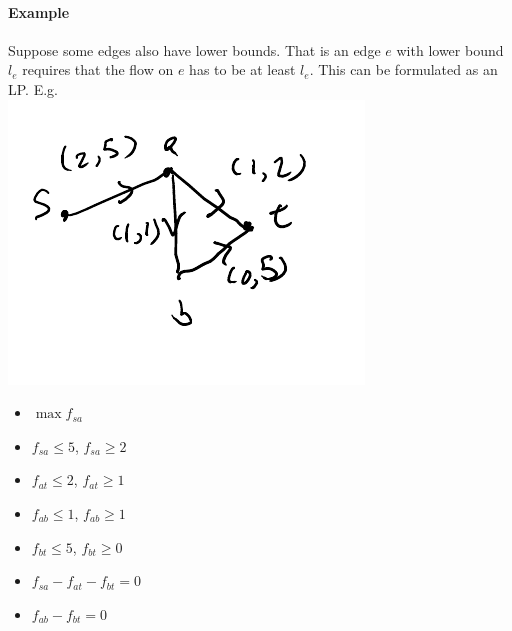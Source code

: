 \documentclass[12 pt]{article}
\begin{document}
        \paragraph{Example}
        Suppose some edges also have lower bounds. 
        That is an edge $e$ with lower bound $l_e$ requires that the
        flow on $e$ has to be at least $l_e$. This can be formulated
        as an LP. E.g.
        \\ \includegraphics[width=.9\textwidth]{i98.pdf}

        \begin{itemize}
        \item $\max f_{sa}$
        \item $f_{sa} \leq 5$, $f_{sa} \geq 2$
        \item $f_{at} \leq 2$, $f_{at} \geq 1$
        \item $f_{ab} \leq 1$, $f_{ab} \geq 1$
        \item $f_{bt} \leq 5$, $f_{bt} \geq 0$
        \item $f_{sa}-f_{at}-f_{bt} = 0$
        \item $f_{ab} - f_{bt} = 0$
        \end{itemize}
\end{document}

